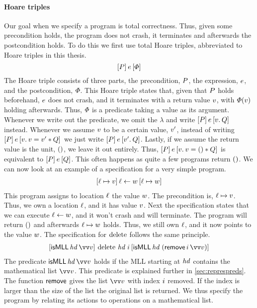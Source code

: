 \documentclass[thesis.tex]{subfiles}
\begin{document}
\paragraph{Hoare triples}
Our goal when we specify a program is total correctness. Thus, given some precondition holds, the program does not crash, it terminates and afterwards the postcondition holds. To do this we first use total Hoare triples, abbreviated to Hoare triples in this thesis.
\[\hoare{\prop}{\expr}{\pred}\]
The Hoare triple consists of three parts, the precondition, $P$, the expression, $e$, and the postcondition, $\varPhi$. This Hoare triple states that, given that $P$ holds beforehand, $e$ does not crash, and it terminates with a return value $v$, with $\varPhi(v)$ holding afterwards. Thus, $\varPhi$ is a predicate taking a value as its argument. Whenever we write out the predicate, we omit the $\lambda$ and write $\hoare{\prop}{\expr}{\Ret\val. \propB}$ instead. Whenever we assume $v$ to be a certain value, $v'$, instead of writing $\hoare{\prop}\expr{\Ret\val. \val = \val' * \propB}$ we just write $\hoare{\prop}\expr{\Ret\val'. \propB}$. Lastly, if we assume the return value is the unit, $()$, we leave it out entirely. Thus, $\hoare{\prop}\expr{\Ret\val. \val = \TT * \propB}$ is equivalent to $\hoare{\prop}\expr{\propB}$. This often happens as quite a few programs return $()$. We can now look at an example of a specification for a very simple program.
\begin{align*}
  \hoare{\loc\fmapsto\val}{\loc\gets\valB}{\loc\fmapsto\valB}
\end{align*}
This program assigns to location $\ell$ the value $w$. The precondition is, $\loc\fmapsto\val$. Thus, we own a location $\ell$, and it has value $v$. Next the specification states that we can execute $\ell\leftarrow w$, and it won't crash and will terminate. The program will return $()$ and afterwards $\loc\fmapsto\valB$ holds. Thus, we still own $\ell$, and it now points to the value $w$. The specification for $\operatorname{delete}$ follows the same principle.
\begin{align*}
  \hoare{\isMLL\, \langv{hd}\, \vect{\val}}{\MLLdelete\, \langv{hd}\; \iindex }{\isMLL\, \langv{hd}\; (\textlog{remove}\, \iindex\, \vect{\val})}
\end{align*}
The predicate $\isMLL\, \langv{hd}\, \vect{\val}$ holds if the MLL starting at $\mathit{hd}$ contains the mathematical list $\vect{\val}$. This predicate is explained further in \cref*{sec:represpreds}. The function $\textsf{\upshape remove}$ gives the list $\vect{\val}$ with index $i$ removed. If the index is larger than the size of the list the original list is returned. We thus specify the program by relating its actions to operations on a mathematical list.
\end{document}
